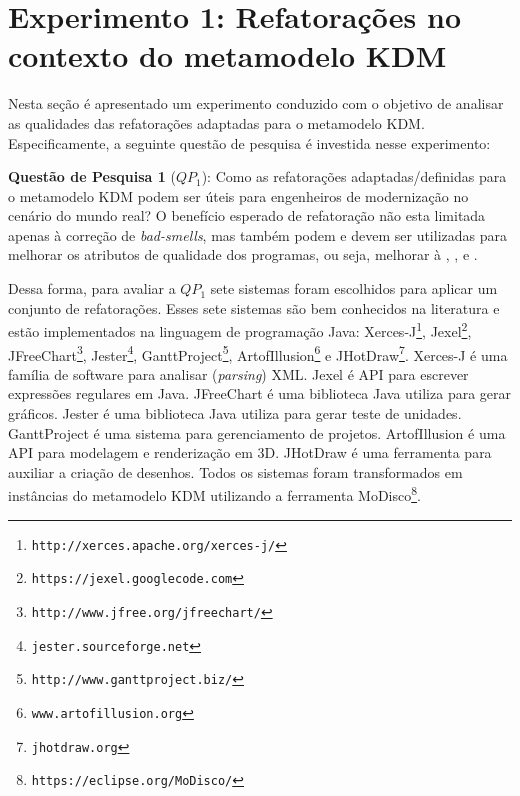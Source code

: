 \section{Experimento 1: Refatorações no contexto do metamodelo KDM}\label{sec:experimento}

Nesta seção é apresentado um experimento conduzido com o objetivo de analisar as qualidades das refatorações adaptadas para o metamodelo KDM. Especificamente, a seguinte questão de pesquisa é investida nesse experimento:

\textbf{Questão de Pesquisa 1} (\textbf{$QP_1$}): Como as refatorações adaptadas/definidas para o metamodelo KDM podem ser úteis para engenheiros de modernização no cenário do mundo real? O benefício esperado de refatoração não esta limitada apenas à correção de \textit{bad-smells}, mas também podem e devem ser utilizadas para melhorar os atributos de qualidade dos programas, ou seja, melhorar à , ,  e .


Dessa forma, para avaliar a \textbf{$QP_1$} sete sistemas foram escolhidos para aplicar um conjunto de refatorações. Esses sete sistemas são bem conhecidos na literatura e estão implementados na linguagem de programação Java: Xerces-J\footnote{\texttt{http://xerces.apache.org/xerces-j/}}, Jexel\footnote{\texttt{https://jexel.googlecode.com}}, JFreeChart\footnote{\texttt{http://www.jfree.org/jfreechart/}}, Jester\footnote{\texttt{jester.sourceforge.net}}, GanttProject\footnote{\texttt{http://www.ganttproject.biz/}}, ArtofIllusion\footnote{\texttt{www.artofillusion.org}} e JHotDraw\footnote{\texttt{jhotdraw.org}}. Xerces-J é uma família de software para analisar (\textit{parsing}) XML. Jexel é API para escrever expressões regulares em Java. JFreeChart é uma biblioteca Java utiliza para gerar gráficos. Jester é uma biblioteca Java utiliza para gerar teste de unidades. GanttProject é uma sistema para gerenciamento de projetos. ArtofIllusion é uma API para modelagem e renderização em 3D. JHotDraw é uma ferramenta para auxiliar a criação de desenhos. Todos os sistemas foram transformados em instâncias do metamodelo KDM utilizando a ferramenta MoDisco\footnote{\texttt{https://eclipse.org/MoDisco/}}. 



